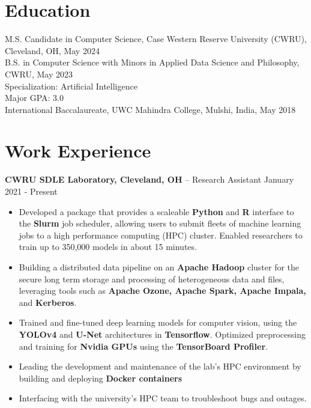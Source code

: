 \documentclass{res}
\begin{document}
 
	\renewcommand{\namefont}{\bfseries\LARGE}
	\renewcommand{\sectionfont}{\bfseries\Large}
	
 
 
\address{ +91 9059059687 \\  rounak@case.edu}
\address{\hfill \href{https://github.com/theroshogolla}{Github: theroshoglla} \\ \hfill \href{https://www.linkedin.com/in/rounakchawla}{LinkedIn: rounakchawla}}
 
\begin{resume} 
 
\section{Education} 
M.S. Candidate in Computer Science, Case Western Reserve University (CWRU), Cleveland, OH, May 2024 \\
B.S. in Computer Science with Minors in Applied Data Science and Philosophy, CWRU, May 2023 \\
Specialization: Artificial Intelligence \\
Major GPA: 3.0 \\
International Baccalaureate, UWC Mahindra College, Mulshi, India,  May 2018

\section{Work Experience} 

{\large{\bf CWRU SDLE Laboratory, Cleveland, OH} – Research Assistant \hfill January 2021 - Present}
\begin{itemize} \itemsep -2pt
	\item Developed a package that provides a scaleable \textbf{Python} and \textbf{R} interface to the \textbf{Slurm} job scheduler, allowing users to submit fleets of machine learning jobs to a high performance computing (HPC) cluster. Enabled researchers to train up to 350,000 models in about 15 minutes.
	\item Building a distributed data pipeline on an \textbf{Apache Hadoop} cluster for the secure long term storage and processing of heterogeneous data and files, leveraging tools such as \textbf{Apache Ozone, Apache Spark, Apache Impala,} and \textbf{Kerberos}.
	\item Trained and fine-tuned deep learning models for computer vision, using the \textbf{YOLOv4} and \textbf{U-Net} architectures in \textbf{Tensorflow}. Optimized preprocessing and training for \textbf{Nvidia GPUs} using the \textbf{TensorBoard Profiler}.
	\item Leading the development and maintenance of the lab's HPC environment by building and deploying \textbf{Docker containers}
	\item Interfacing with the university's HPC team to troubleshoot bugs and outages.
\end{itemize}



\end{resume}
\end{document}
